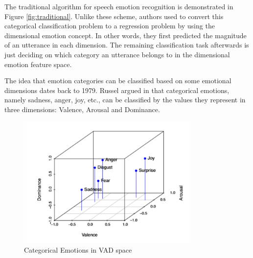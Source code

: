 \documentclass[a4paper,11pt]{article}
\begin{document}
The traditional algorithm for speech emotion recognition is demonstrated in Figure \ref{fig:traditional}. Unlike these scheme, authors used to convert this categorical classification problem to a regression problem by using the dimensional emotion concept. In other words, they first predicted the magnitude of an utterance in each dimension. The remaining classification task afterwards is just deciding on which category an utterance belongs to in the dimensional emotion feature space. 

\pagebreak

The idea that emotion categories can be classified based on some emotional dimensions dates back to 1979. Russel argued in \cite{russell1979affective} that categorical emotions, namely sadness, anger, joy, etc., can be classified by the values they represent in three dimensions: Valence, Arousal and Dominance.

\begin{figure}[h]
\centering
\includegraphics[width=0.8\textwidth]{dimensions_pic.png}
\caption{Categorical Emotions in VAD space \cite{bualan2020emotion}}\label{fig:dimensions}
\end{figure}

\begin{table}[h]
\caption{\label{tab:vadtable}VAD Dimensions of 6 basic emotions \cite{bualan2020emotion}.}
\end{table}
\end{document}
